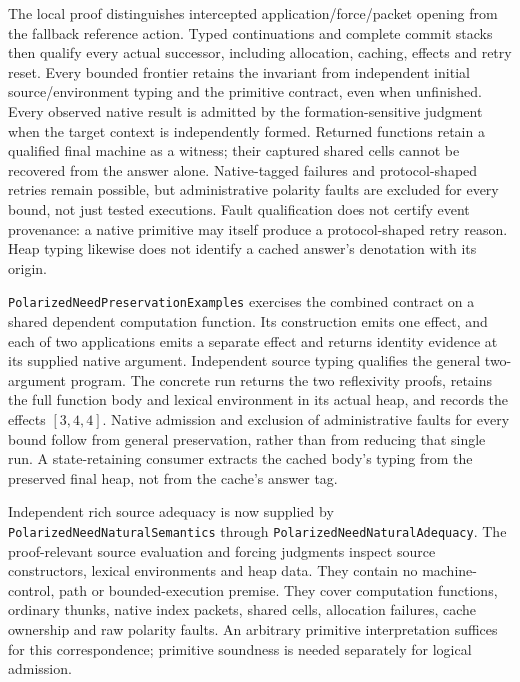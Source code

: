 \documentclass[11pt]{article}
\theoremstyle{definition}
\theoremstyle{remark}
\begin{document}
The local proof distinguishes intercepted application/force/packet opening
from the fallback reference action. Typed continuations and complete commit
stacks then qualify every actual successor, including allocation, caching,
effects and retry reset. Every bounded frontier retains the invariant from
independent initial source/environment typing and the primitive contract,
even when unfinished. Every observed native result is admitted by the
formation-sensitive judgment when the target context is independently
formed. Returned functions retain a qualified final machine as a witness;
their captured shared cells cannot be recovered from the answer alone.
Native-tagged failures and protocol-shaped retries remain possible, but
administrative polarity faults are excluded for every bound, not just tested
executions. Fault qualification does not certify event provenance: a native
primitive may itself produce a protocol-shaped retry reason. Heap typing
likewise does not identify a cached answer's denotation with its origin.

\nolinkurl{PolarizedNeedPreservationExamples} exercises the combined
contract on a shared dependent computation function. Its construction emits
one effect, and each of two applications emits a separate effect and returns
identity evidence at its supplied native argument. Independent source typing
qualifies the general two-argument program. The concrete run returns the two
reflexivity proofs, retains the full function body and lexical environment
in its actual heap, and records the effects $[3,4,4]$.
Native admission and exclusion of administrative faults for every bound
follow from general preservation, rather than from reducing that single run.
A state-retaining consumer extracts the cached body's typing from the
preserved final heap, not from the cache's answer tag.

Independent rich source adequacy is now supplied by
\nolinkurl{PolarizedNeedNaturalSemantics} through
\nolinkurl{PolarizedNeedNaturalAdequacy}. The proof-relevant source evaluation
and forcing judgments inspect source constructors, lexical environments and
heap data. They contain no machine-control, path or bounded-execution premise.
They cover computation functions, ordinary thunks, native index packets,
shared cells, allocation failures, cache ownership and raw polarity faults.
An arbitrary primitive interpretation suffices for this correspondence;
primitive soundness is needed separately for logical admission.
\end{document}
